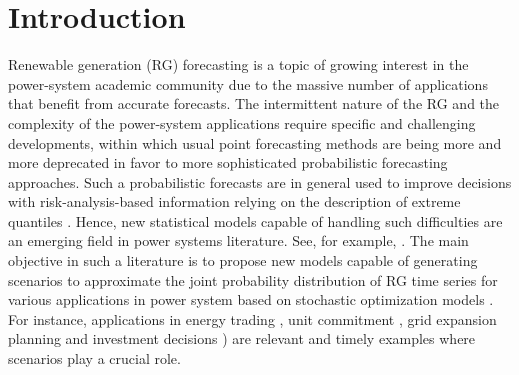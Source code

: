 \section{Introduction} \label{sec:introduction}





Renewable generation (RG) forecasting is a topic of growing interest in the power-system academic community due to the massive number of applications that benefit from accurate forecasts. The intermittent nature of the RG and the complexity of the power-system applications require specific and challenging developments, within which usual point forecasting methods are being more and more deprecated in favor to more sophisticated probabilistic forecasting approaches. Such a probabilistic forecasts are in general used to improve decisions with risk-analysis-based information relying on the description of extreme quantiles \cite{pinson_probabilistic_2009}. Hence, new statistical models capable of handling such difficulties are an emerging field in power systems literature. See, for example, \cite{bessa2012time, gallego2016line,moller_time-adaptive_2008,nielsen2006,bremnes_probabilistic_2004,wan_direct_2017}. The main objective in such a literature is to propose new models capable of generating scenarios to approximate the joint probability distribution of RG time series for various applications in power system based on stochastic optimization models \cite{BirgeBook2011}. For instance, applications in energy trading \cite{Fanzeres2015}, unit commitment \cite{papa2013,papa2015}, grid expansion planning and investment decisions \cite{Aderson2017,munoz2015,moreno2019}) are relevant and timely examples where scenarios play a crucial role. 


